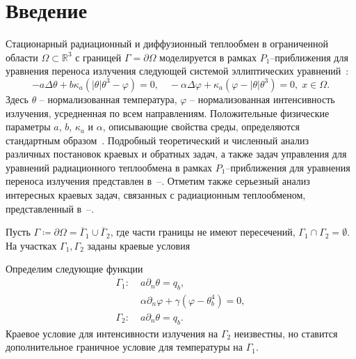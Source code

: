 \section{Введение}\label{sec:intro}
Стационарный радиационный и диффузионный теплообмен в ограниченной области
$\Omega \subset \mathbb{R}^3$ с границей $\Gamma = \partial \Omega$ моделируется в рамках  $P_1$--приближения для уравнения
переноса излучения следующей системой эллиптических уравнений~\cite{Pinnau07, AMC-13, Kovt14-1}:
\begin{equation}
    \label{eq:model}
    - a \Delta\theta + b\kappa_a(|\theta|\theta^3- \varphi)=0,   \quad
    - \alpha \Delta \varphi + \kappa_a(\varphi-|\theta|\theta^3)=0,\; x\in\Omega.
\end{equation}
Здесь $\theta$ -- нормализованная температура, $\varphi$ -- нормализованная интенсивность излучения,
усредненная по всем направлениям.
Положительные физические параметры $a$, $b$, $\kappa_a$ и $\alpha$, описывающие
свойства среды, определяются стандартным образом~\cite{Kovt14-1}.
Подробный теоретический и численный анализ различных постановок краевых и обратных задач,
а также задач управления для уравнений радиационного теплообмена
в рамках $P_1$--приближения для уравнения переноса излучения представлен в~\cite{Pinnau07}--\cite{CMMP20}.
Отметим также серьезный анализ интересных краевых задач, связанных с радиационным теплообменом,
представленный в~\cite{Amosov05}--\cite{Amosov20}.

Пусть $\Gamma \coloneqq \partial \Omega =\overline{\Gamma}_1 \cup \overline{\Gamma}_2$,
где части границы не имеют пересечений, $\Gamma_1 \cap \Gamma_2 =  \emptyset$.
На участках $\Gamma_1, \Gamma_2$ заданы краевые условия

Определим следующие функции
\begin{equation}
    \label{eq:boundary}
    \begin{aligned}
        \Gamma_1 :\; &a \partial_n \theta = q_b, \\
        &\alpha\partial_n\varphi + \gamma (\varphi - \theta_b ^4 ) = 0, \\
        \Gamma_2 :\; & a \partial_n \theta = q_b.
    \end{aligned}
\end{equation}
Краевое условие для интенсивности излучения на $\Gamma_2$ неизвестны, но ставится дополнительное
граничное условие для температуры на $\Gamma_1$.

